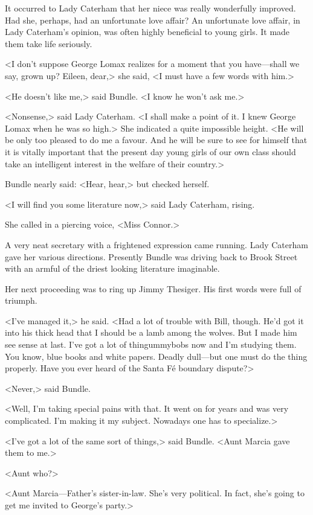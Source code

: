 It occurred to Lady Caterham that her niece was really wonderfully improved. Had she, perhaps, had an unfortunate love affair? An unfortunate love affair, in Lady Caterham's opinion, was often highly beneficial to young girls. It made them take life seriously.

<I don't suppose George Lomax realizes for a moment that you have—shall we say, grown up? Eileen, dear,> she said, <I must have a few words with him.>

<He doesn't like me,> said Bundle. <I know he won't ask me.>

<Nonsense,> said Lady Caterham. <I shall make a point of it. I knew George Lomax when he was so high.> She indicated a quite impossible height. <He will be only too pleased to do me a favour. And he will be sure to see for himself that it is vitally important that the present day young girls of our own class should take an intelligent interest in the welfare of their country.>

Bundle nearly said: <Hear, hear,> but checked herself.

<I will find you some literature now,> said Lady Caterham, rising.

She called in a piercing voice, <Miss Connor.>

A very neat secretary with a frightened expression came running. Lady Caterham gave her various directions. Presently Bundle was driving back to Brook Street with an armful of the driest looking literature imaginable.

Her next proceeding was to ring up Jimmy Thesiger. His first words were full of triumph.

<I've managed it,> he said. <Had a lot of trouble with Bill, though. He'd got it into his thick head that I should be a lamb among the wolves. But I made him see sense at last. I've got a lot of thingummybobs now and I'm studying them. You know, blue books and white papers. Deadly dull—but one must do the thing properly. Have you ever heard of the Santa Fé boundary dispute?>

<Never,> said Bundle.

<Well, I'm taking special pains with that. It went on for years and was very complicated. I'm making it my subject. Nowadays one has to specialize.>

<I've got a lot of the same sort of things,> said Bundle. <Aunt Marcia gave them to me.>

<Aunt who?>

<Aunt Marcia—Father's sister-in-law. She's very political. In fact, she's going to get me invited to George's party.>

